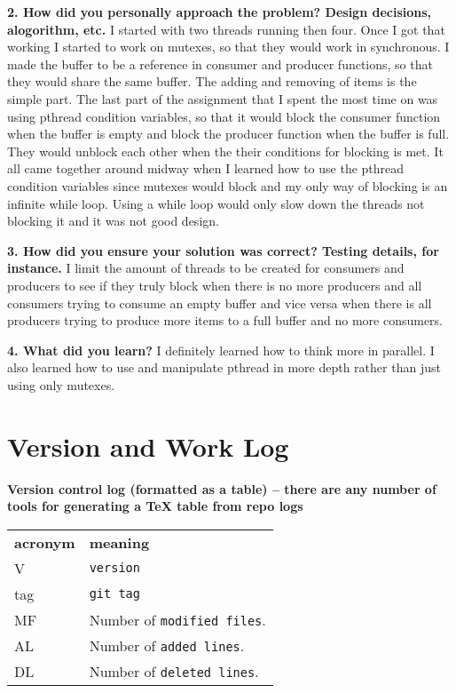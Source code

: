 \documentclass[draftclsnofoot,onecolumn,letterpaper,10pt,titlepage]{IEEEtran}
\begin{document}
    \textbf{2. How did you personally approach the problem? Design decisions, alogorithm, etc.}
    I started with two threads running then four. Once I got that working I started to work on mutexes, so that they would work in synchronous. I made the buffer to be a reference in consumer and producer functions, so that they would share the same buffer. The adding and removing of items is the simple part. The last part of the assignment that I spent the most time on was using pthread condition variables, so that it would block the consumer function when the buffer is empty and block the producer function when the buffer is full. They would unblock each other when the their conditions for blocking is met. It all came together around midway when I learned how to use the pthread condition variables since mutexes would block and my only way of blocking is an infinite while loop. Using a while loop would only slow down the threads not blocking it and it was not good design.       

    \textbf{3. How did you ensure your solution was correct? Testing details, for instance.}
    I limit the amount of threads to be created for consumers and producers to see if they truly block when there is no more producers and all consumers trying to consume an empty buffer and vice versa when there is all producers trying to produce more items to a full buffer and no more consumers.

    \textbf{4. What did you learn?}
    I definitely learned how to think more in parallel. I also learned how to use and manipulate pthread in more depth rather than just using only mutexes.


\section{Version and Work Log}
\textbf{Version control log (formatted as a table) -- there are any number of tools for generating a TeX table from repo logs}
\begin{tabular}{lp{12cm}}
  \label{tabular:legend:git-log}
  \textbf{acronym} & \textbf{meaning} \\
  V & \texttt{version} \\
  tag & \texttt{git tag} \\
  MF & Number of \texttt{modified files}. \\
  AL & Number of \texttt{added lines}. \\
  DL & Number of \texttt{deleted lines}. \\
\end{tabular}
\end{document}
